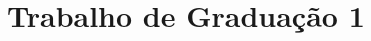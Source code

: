 \documentclass[ecp,tc]{iiufrgs}
\begin{document}
%
%
%
%
%
%
%
%




\annex
\chapter{Trabalho de Graduação 1}
\label{tg1}
\end{document}
